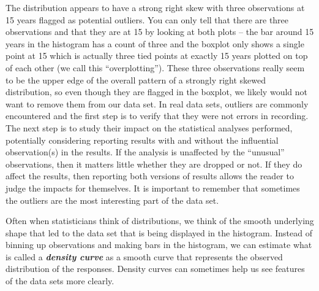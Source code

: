 \documentclass[]{book}
\theoremstyle{definition}
\theoremstyle{definition}
\theoremstyle{remark}
\begin{document}
The distribution appears to have a strong right skew with three
observations at 15 years flagged as potential outliers. You can only
tell that there are three observations and that they are at 15 by
looking at both plots -- the bar around 15 years in the histogram has a
count of three and the boxplot only shows a single point at 15 which is
actually three tied points at exactly 15 years plotted on top of each
other (we call this ``overplotting''). These three observations really
seem to be the upper edge of the overall pattern of a strongly right
skewed distribution, so even though they are flagged in the boxplot, we
likely would not want to remove them from our data set. In real data
sets, outliers are commonly encountered and the first step is to verify
that they were not errors in recording. The next step is to study their
impact on the statistical analyses performed, potentially considering
reporting results with and without the influential observation(s) in the
results. If the analysis is unaffected by the ``unusual'' observations,
then it matters little whether they are dropped or not. If they do
affect the results, then reporting both versions of results allows the
reader to judge the impacts for themselves. It is important to remember
that sometimes the outliers are the most interesting part of the data
set.

Often when statisticians think of distributions, we think of the smooth
underlying shape that led to the data set that is being displayed in the
histogram. Instead of binning up observations and making bars in the
histogram, we can estimate what is called a \textbf{\emph{density curve
}} as a smooth curve that represents the observed distribution of the
responses. Density curves can sometimes help us see features of the data
sets more clearly.
\end{document}
